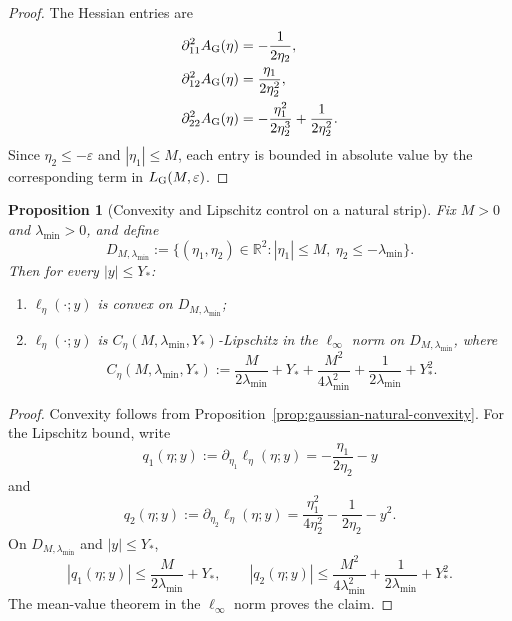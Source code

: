\documentclass[11pt]{article}
\newtheorem{proposition}[theorem]{Proposition}
\theoremstyle{definition}
\newcommand{\R}{\mathbb{R}}
\begin{document}
\begin{proof}
The Hessian entries are
\begin{align*}
  \partial_{11}^2 A_{\rm G}(\eta)
  &=
  -\frac{1}{2\eta_2},
  \\
  \partial_{12}^2 A_{\rm G}(\eta)
  &=
  \frac{\eta_1}{2\eta_2^2},
  \\
  \partial_{22}^2 A_{\rm G}(\eta)
  &=
  -\frac{\eta_1^2}{2\eta_2^3}+\frac{1}{2\eta_2^2}.
\end{align*}
Since $\eta_2\le -\varepsilon$ and $|\eta_1|\le M$, each entry is bounded in
absolute value by the corresponding term in $L_{\rm G}(M,\varepsilon)$.
\end{proof}

\begin{proposition}[Convexity and Lipschitz control on a natural strip]
\label{prop:convex-lipschitz-strip-k1}
Fix $M>0$ and $\lambda_{\min}>0$, and define
\[
  D_{M,\lambda_{\min}}
  :=
  \{(\eta_1,\eta_2)\in\R^2: |\eta_1|\le M,\ \eta_2\le -\lambda_{\min}\}.
\]
Then for every $|y|\le Y_\ast$:
\begin{enumerate}[label=(\roman*)]
  \item $\ell_\eta(\cdot;y)$ is convex on $D_{M,\lambda_{\min}}$;
  \item $\ell_\eta(\cdot;y)$ is
  $C_\eta(M,\lambda_{\min},Y_\ast)$-Lipschitz in the $\ell_\infty$ norm on
  $D_{M,\lambda_{\min}}$, where
  \begin{equation}
    C_\eta(M,\lambda_{\min},Y_\ast)
    :=
    \frac{M}{2\lambda_{\min}} + Y_\ast
    + \frac{M^2}{4\lambda_{\min}^2}
    + \frac{1}{2\lambda_{\min}}
    + Y_\ast^2.
    \label{eq:Ceta-k1}
  \end{equation}
\end{enumerate}
\end{proposition}

\begin{proof}
Convexity follows from Proposition~\ref{prop:gaussian-natural-convexity}.
For the Lipschitz bound, write
\[
  q_1(\eta;y)
  :=
  \partial_{\eta_1}\ell_\eta(\eta;y)
  =
  -\frac{\eta_1}{2\eta_2}-y
\]
and
\[
  q_2(\eta;y)
  :=
  \partial_{\eta_2}\ell_\eta(\eta;y)
  =
  \frac{\eta_1^2}{4\eta_2^2}
  -
  \frac{1}{2\eta_2}
  -
  y^2.
\]
On $D_{M,\lambda_{\min}}$ and $|y|\le Y_\ast$,
\[
  |q_1(\eta;y)|
  \le
  \frac{M}{2\lambda_{\min}}+Y_\ast,
  \qquad
  |q_2(\eta;y)|
  \le
  \frac{M^2}{4\lambda_{\min}^2}
  +
  \frac{1}{2\lambda_{\min}}
  +
  Y_\ast^2.
\]
The mean-value theorem in the $\ell_\infty$ norm proves the claim.
\end{proof}
\end{document}
